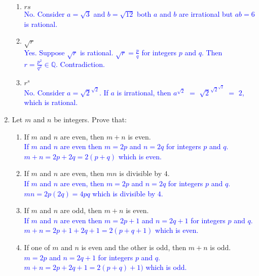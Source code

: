 \documentclass[13.5pt]{article}
\begin{document}
\begin{enumerate}
\begin{enumerate}
\item {\(rs\)}\\
\textcolor{blue} {No. Consider \(a=\sqrt{3}\) and \(b=\sqrt{12}\) both \(a\) and \(b\) are irrational but \(ab=6\) is rational.} 

\item {\(\sqrt{r}\)}\\
\textcolor{blue} {Yes. Suppose \(\sqrt{r}\) is rational. \(\sqrt{r}=\frac{p}{q}\) for integers \(p\) and \(q\). Then \(r=\frac{p^2}{q^2} \in\mathbb{Q}\). Contradiction.} 

\item {\(r^s\)}\\
\textcolor{blue} {No. Consider \(a=\sqrt{2}^\sqrt{2}\). If \(a\) is irrational, then \(a^\sqrt{2}\) \(=\) \( \sqrt{2}^\sqrt{2}^\sqrt{2} \) \(=\) \(2\), which is rational.} 

\end{enumerate}


\item{Let \(m\) and \(n\) be integers. Prove that:}
\begin{enumerate}
\setlength{\itemindent}{.1in}
\item {If \(m\) and \(n\) are even, then \(m+n\) is even.}\\
\textcolor{blue} {If \(m\) and \(n\) are even then \(m=2p\) and \(n=2q\) for integers \(p\) and \(q\).}\\
\textcolor{blue} {\(m+n=2p+2q=2(p+q)\) which is even.} 

\item {If \(m\) and \(n\) are even, then \(mn\) is divisible by \(4\).}\\
\textcolor{blue} {If \(m\) and \(n\) are even, then \(m=2p\) and \(n=2q\) for integers \(p\) and \(q\).}\\
\textcolor{blue} {\(mn=2p(2q)=4pq\) which is divisible by \(4\).}

\item {If \(m\) and \(n\) are odd, then \(m+n\) is even.}\\
\textcolor{blue} {If \(m\) and \(n\) are even then \(m=2p+1\) and \(n=2q+1\) for integers \(p\) and \(q\).}\\
\textcolor{blue} {\(m+n=2p+1+2q+1=2(p+q+1)\) which is even.} 

\item {If one of \(m\) and \(n\) is even and the other is odd, then \(m+n\) is odd.}\\
\textcolor{blue} {\(m=2p\) and \(n=2q+1\) for integers \(p\) and \(q\).}\\
\textcolor{blue} {\(m+n=2p+2q+1=2(p+q)+1)\) which is odd.} 


\end{enumerate}
\end{enumerate}
\end{document}
